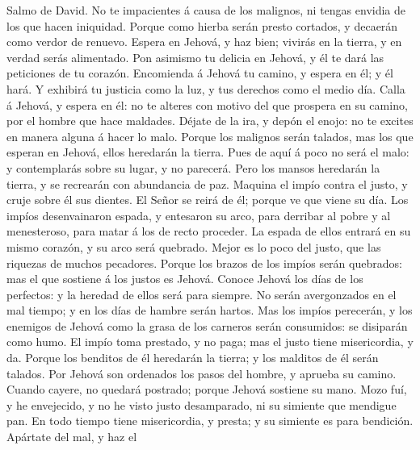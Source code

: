  Salmo de David. No te impacientes á causa de los
malignos, ni tengas envidia de los que hacen iniquidad. 
Porque como hierba serán presto cortados, y decaerán como verdor de
renuevo.  Espera en Jehová, y haz bien; vivirás en la
tierra, y en verdad serás alimentado.  Pon asimismo tu
delicia en Jehová, y él te dará las peticiones de tu corazón.
 Encomienda á Jehová tu camino, y espera en él; y él hará.
 Y exhibirá tu justicia como la luz, y tus derechos como
el medio día.  Calla á Jehová, y espera en él: no te
alteres con motivo del que prospera en su camino, por el hombre que hace
maldades.  Déjate de la ira, y depón el enojo: no te
excites en manera alguna á hacer lo malo.  Porque los
malignos serán talados, mas los que esperan en Jehová, ellos heredarán
la tierra.  Pues de aquí á poco no será el malo: y
contemplarás sobre su lugar, y no parecerá.  Pero los
mansos heredarán la tierra, y se recrearán con abundancia de paz.
 Maquina el impío contra el justo, y cruje sobre él sus
dientes.  El Señor se reirá de él; porque ve que viene su
día.  Los impíos desenvainaron espada, y entesaron su
arco, para derribar al pobre y al menesteroso, para matar á los de recto
proceder.  La espada de ellos entrará en su mismo
corazón, y su arco será quebrado.  Mejor es lo poco del
justo, que las riquezas de muchos pecadores.  Porque los
brazos de los impíos serán quebrados: mas el que sostiene á los justos
es Jehová.  Conoce Jehová los días de los perfectos: y la
heredad de ellos será para siempre.  No serán
avergonzados en el mal tiempo; y en los días de hambre serán hartos.
 Mas los impíos perecerán, y los enemigos de Jehová como
la grasa de los carneros serán consumidos: se disiparán como humo.
 El impío toma prestado, y no paga; mas el justo tiene
misericordia, y da.  Porque los benditos de él heredarán
la tierra; y los malditos de él serán talados.  Por
Jehová son ordenados los pasos del hombre, y aprueba su camino.
 Cuando cayere, no quedará postrado; porque Jehová
sostiene su mano.  Mozo fuí, y he envejecido, y no he
visto justo desamparado, ni su simiente que mendigue pan.
 En todo tiempo tiene misericordia, y presta; y su
simiente es para bendición.  Apártate del mal, y haz el

